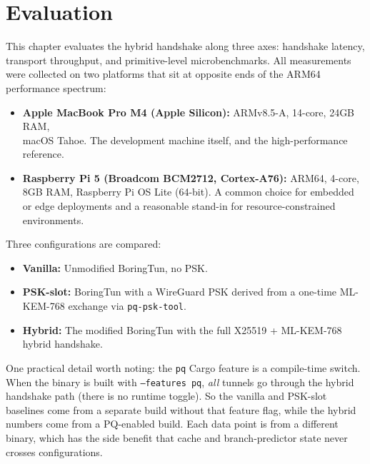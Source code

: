 \chapter{Evaluation}
\label{chap:evaluation}

This chapter evaluates the hybrid handshake along three axes: handshake latency, transport throughput, and primitive-level microbenchmarks. All measurements were collected on two platforms that sit at opposite ends of the ARM64 performance spectrum:

\begin{itemize}
    \item \textbf{Apple MacBook Pro M4 (Apple Silicon):} ARMv8.5-A, 14-core, 24GB RAM,\\macOS Tahoe. The development machine itself, and the high-performance reference.

    \item \textbf{Raspberry Pi 5 (Broadcom BCM2712, Cortex-A76):} ARM64, 4-core, 8GB RAM, Raspberry Pi OS Lite (64-bit). A common choice for embedded or edge deployments and a reasonable stand-in for resource-constrained environments.
\end{itemize}

\noindent Three configurations are compared:

\begin{itemize}
    \item \textbf{Vanilla:} Unmodified BoringTun, no PSK.

    \item \textbf{PSK-slot:} BoringTun with a WireGuard PSK derived from a one-time ML-KEM-768 exchange via \texttt{pq-psk-tool}.

    \item \textbf{Hybrid:} The modified BoringTun with the full X25519 + ML-KEM-768 hybrid handshake.
\end{itemize}

One practical detail worth noting: the \texttt{pq} Cargo feature is a compile-time switch. When the binary is built with \texttt{--features pq}, \emph{all} tunnels go through the hybrid handshake path (there is no runtime toggle). So the vanilla and PSK-slot baselines come from a separate build without that feature flag, while the hybrid numbers come from a PQ-enabled build. Each data point is from a different binary, which has the side benefit that cache and branch-predictor state never crosses configurations.

